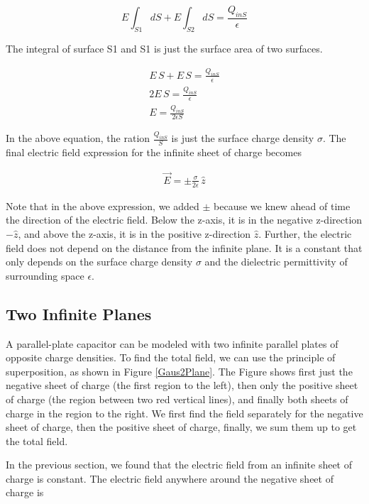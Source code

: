 \documentclass{ximera}
\begin{document}
 

\begin{equation}
E \int_{S1} dS + E \int_{S2} dS = \frac{Q_{inS}}{\epsilon}
\end{equation}

 The integral of surface S1 and S1 is just the surface area of two surfaces.
 
\begin{eqnarray}
E \, S + E \, S = \frac{Q_{inS}}{\epsilon} \\
 2 E \,S = \frac{Q_{inS}}{\epsilon} \\
 E=\frac{Q_{inS}}{2 \epsilon S}
\end{eqnarray}

In the above equation, the ration $\frac{Q_{inS}}{S}$ is just the surface charge density $\sigma$. The final electric field expression for the infinite sheet of charge becomes

\begin{eqnarray}
 \vec{E}  = \pm \frac{\sigma}{2 \epsilon } \, \hat{z}
\end{eqnarray}

Note that in the above expression, we added $\pm$ because we knew ahead of time the direction of the electric field. Below the z-axis, it is in the negative z-direction $-\hat{z}$, and above the z-axis, it is in the positive z-direction $\hat{z}$. Further, the electric field does not depend on the distance from the infinite plane. It is a constant that only depends on the surface charge density $\sigma$ and the dielectric permittivity of surrounding space $\epsilon$.

\subsection{Two Infinite Planes}


A parallel-plate capacitor can be modeled with two infinite parallel plates of opposite charge densities. To find the total field, we can use the principle of superposition, as shown in Figure \ref{Gaus2Plane}. The Figure shows first just the negative sheet of charge (the first region to the left), then only the positive sheet of charge (the region between two red vertical lines), and finally both sheets of charge in the region to the right. We first find the field separately for the negative sheet of charge, then the positive sheet of charge, finally, we sum them up to get the total field. 

In the previous section, we found that the electric field from an infinite sheet of charge is constant. The electric field anywhere around the negative sheet of charge is
\end{document}
